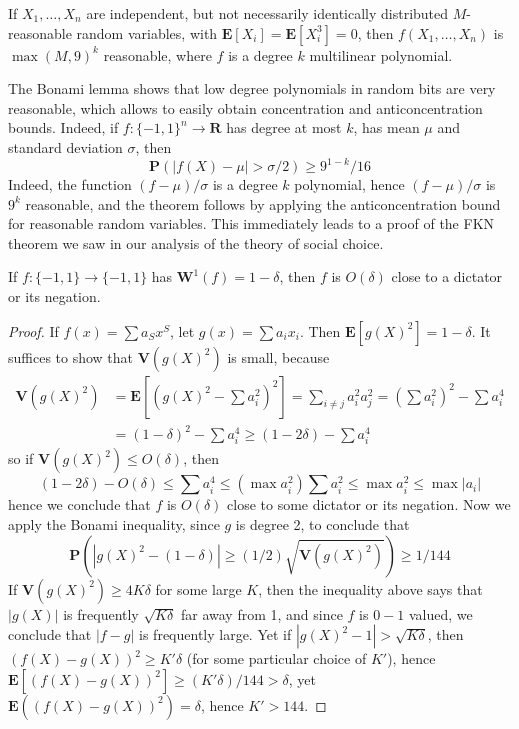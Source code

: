 \begin{corollary}
    If $X_1, \dots, X_n$ are independent, but not necessarily identically distributed $M$-reasonable random variables, with $\mathbf{E}[X_i] = \mathbf{E}[X_i^3] = 0$, then $f(X_1, \dots, X_n)$ is $\max(M,9)^k$ reasonable, where $f$ is a degree $k$ multilinear polynomial.
\end{corollary}

The Bonami lemma shows that low degree polynomials in random bits are very reasonable, which allows to easily obtain concentration and anticoncentration bounds. Indeed, if $f: \{ -1, 1 \}^n \to \mathbf{R}$ has degree at most $k$, has mean $\mu$ and standard deviation $\sigma$, then
%
\[ \mathbf{P}(|f(X) - \mu| > \sigma/2) \geq 9^{1-k}/16 \]
%
Indeed, the function $(f - \mu)/\sigma$ is a degree $k$ polynomial, hence $(f - \mu)/\sigma$ is $9^k$ reasonable, and the theorem follows by applying the anticoncentration bound for reasonable random variables. This immediately leads to a proof of the FKN theorem we saw in our analysis of the theory of social choice.

\begin{theorem}
    If $f: \{ -1, 1 \} \to \{ -1, 1 \}$ has $\mathbf{W}^1(f) = 1 - \delta$, then $f$ is $O(\delta)$ close to a dictator or its negation.
\end{theorem}
\begin{proof}
    If $f(x) = \sum a_S x^S$, let $g(x) = \sum a_i x_i$. Then $\mathbf{E}[g(X)^2] = 1 - \delta$. It suffices to show that $\mathbf{V}(g(X)^2)$ is small, because
    \begin{align*}
        \mathbf{V}(g(X)^2) &= \mathbf{E} \left[ \left(g(X)^2 - \sum a_i^2 \right)^2 \right] = \sum_{i \neq j} a_i^2 a_j^2 = \left( \sum a_i^2 \right)^2 - \sum a_i^4\\
        &= (1 - \delta)^2 - \sum a_i^4 \geq (1 - 2\delta) - \sum a_i^4
    \end{align*}
    so if $\mathbf{V}(g(X)^2) \leq O(\delta)$, then
    \[ (1 - 2\delta) - O(\delta) \leq \sum a_i^4 \leq \left( \max a_i^2 \right) \sum a_i^2 \leq \max a_i^2 \leq \max |a_i| \]
    hence we conclude that $f$ is $O(\delta)$ close to some dictator or its negation. Now we apply the Bonami inequality, since $g$ is degree 2, to conclude that
    \[ \mathbf{P} \left( |g(X)^2 - (1 - \delta)| \geq (1/2) \sqrt{\mathbf{V}(g(X)^2)} \right) \geq 1/144 \]
    If $\mathbf{V}(g(X)^2) \geq 4K \delta$ for some large $K$, then the inequality above says that $|g(X)|$ is frequently $\sqrt{K \delta}$ far away from 1, and since $f$ is $0-1$ valued, we conclude that $|f - g|$ is frequently large. Yet if $|g(X)^2 - 1| > \sqrt{K\delta}$, then $(f(X) - g(X))^2 \geq K' \delta$ (for some particular choice of $K'$), hence $\mathbf{E}[(f(X) - g(X))^2] \geq (K' \delta)/144 > \delta$, yet $\mathbf{E}((f(X) - g(X))^2) = \delta$, hence $K' > 144$.
\end{proof}

